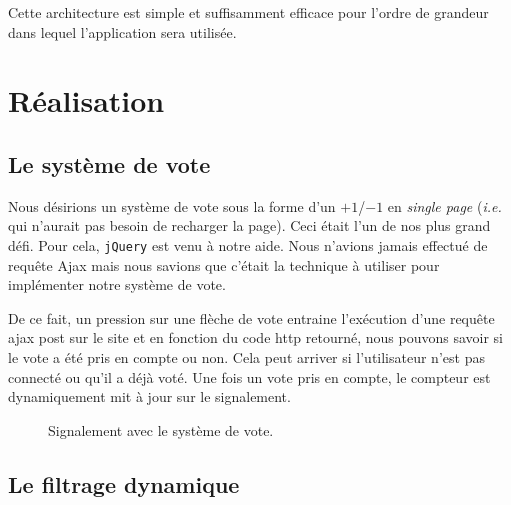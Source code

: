\documentclass[a4paper,11pt]{article}
\begin{document}
Cette architecture est simple et suffisamment efficace pour l'ordre de grandeur dans lequel l'application sera utilisée.
\section{Réalisation}

\subsection{Le système de vote}

Nous désirions un système de vote sous la forme d'un $+1$/$-1$ en \textit{single page} (\textit{i.e.} qui n'aurait pas besoin de recharger la page). Ceci était l'un de nos plus grand défi. Pour cela, \texttt{jQuery} est venu à notre aide. Nous n'avions jamais effectué de requête Ajax mais nous savions que c'était la technique à utiliser pour implémenter notre système de vote.

De ce fait, un pression sur une flèche de vote entraine l'exécution d'une requête ajax post sur le site et en fonction du code \textsf{http} retourné, nous pouvons savoir si le vote a été pris en compte ou non. Cela peut arriver si l'utilisateur n'est pas connecté ou qu'il a déjà voté. Une fois un vote pris en compte, le compteur est dynamiquement mit à jour sur le signalement.\\

\begin{figure}[!h]
	\centering
	\caption{Signalement avec le système de vote.}
\end{figure}

\pagebreak
\subsection{Le filtrage dynamique}
\end{document}
